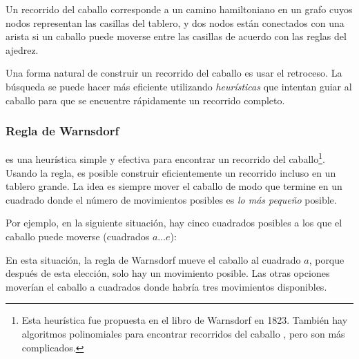 \begin{center}
\end{center}

Un recorrido del caballo corresponde a un camino hamiltoniano en un grafo
cuyos nodos representan las casillas del tablero,
y dos nodos están conectados con una arista si un caballo
puede moverse entre las casillas de acuerdo con las reglas del ajedrez.

Una forma natural de construir un recorrido del caballo es usar el retroceso.
La búsqueda se puede hacer más eficiente utilizando
\emph{heurísticas} que intentan guiar al caballo para que
se encuentre rápidamente un recorrido completo.

\subsubsection{Regla de Warnsdorf}

 es una heurística simple y efectiva
para encontrar un recorrido del caballo\footnote{Esta heurística fue propuesta
en el libro de Warnsdorf \cite{war23} en 1823. También hay
algoritmos polinomiales para encontrar recorridos del caballo
\cite{par97}, pero son más complicados.}.
Usando la regla, es posible construir eficientemente un recorrido
incluso en un tablero grande.
La idea es siempre mover el caballo de modo que termine
en un cuadrado donde el número de movimientos posibles es
\emph{lo más pequeño} posible.

Por ejemplo, en la siguiente situación, hay cinco
cuadrados posibles a los que el caballo puede moverse (cuadrados $a \ldots e$):
\begin{center}
\end{center}
En esta situación, la regla de Warnsdorf mueve el caballo al cuadrado $a$,
porque después de esta elección, solo hay un movimiento posible.
Las otras opciones moverían el caballo a cuadrados donde
habría tres movimientos disponibles.
